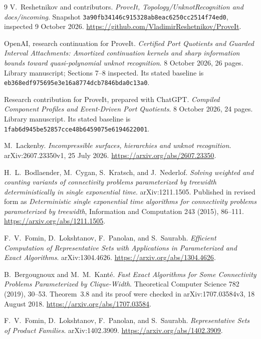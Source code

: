 \documentclass[11pt,a4paper]{article}
\theoremstyle{remark}\newtheorem{remark}[theorem]{Remark}
\newcommand{\snapshot}{3a90fb34146c915328ab8eac6250cc2514f74ed0}
\begin{document}
\clearpage
\begin{thebibliography}{9}
V.~Reshetnikov and contributors.
\emph{ProveIt, Topology/UnknotRecognition and docs/incoming}.
Snapshot \texttt{\snapshot}, inspected 9 October 2026.
\url{https://github.com/VladimirReshetnikov/ProveIt}.

OpenAI, research continuation for ProveIt.
\emph{Certified Port Quotients and Guarded Interval Attachments: Amortized continuation kernels and sharp information bounds toward quasi-polynomial unknot recognition}.
8 October 2026, 26 pages. Library manuscript; Sections 7--8 inspected.
Its stated baseline is \texttt{eb368edf975695e3e16a8774dcb7846bda0c13a0}.

Research contribution for ProveIt, prepared with ChatGPT.
\emph{Compiled Component Profiles and Event-Driven Port Quotients}.
8 October 2026, 24 pages. Library manuscript.
Its stated baseline is \texttt{1fab6d945be52857cce48b6459075e6194622001}.

M.~Lackenby.
\emph{Incompressible surfaces, hierarchies and unknot recognition}.
arXiv:2607.23350v1, 25 July 2026.
\url{https://arxiv.org/abs/2607.23350}.

H.~L.~Bodlaender, M.~Cygan, S.~Kratsch, and J.~Nederlof.
\emph{Solving weighted and counting variants of connectivity problems parameterized by treewidth deterministically in single exponential time}.
arXiv:1211.1505. Published in revised form as
\emph{Deterministic single exponential time algorithms for connectivity problems parameterized by treewidth}, Information and Computation 243 (2015), 86--111.
\url{https://arxiv.org/abs/1211.1505}.

F.~V.~Fomin, D.~Lokshtanov, F.~Panolan, and S.~Saurabh.
\emph{Efficient Computation of Representative Sets with Applications in Parameterized and Exact Algorithms}.
arXiv:1304.4626.
\url{https://arxiv.org/abs/1304.4626}.

B.~Bergougnoux and M.~M.~Kant\'e.
\emph{Fast Exact Algorithms for Some Connectivity Problems Parameterized by Clique-Width}.
Theoretical Computer Science 782 (2019), 30--53.
Theorem~3.8 and its proof were checked in arXiv:1707.03584v3, 18 August 2018.
\url{https://arxiv.org/abs/1707.03584}.

F.~V.~Fomin, D.~Lokshtanov, F.~Panolan, and S.~Saurabh.
\emph{Representative Sets of Product Families}.
arXiv:1402.3909.
\url{https://arxiv.org/abs/1402.3909}.
\end{thebibliography}
\end{document}
